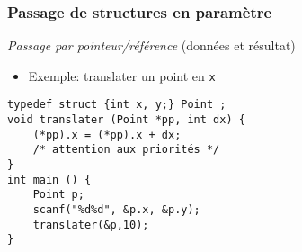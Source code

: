 \documentclass[table,handout,tikz,12pt,svgnames]{beamer}
\begin{document}
\begin{frame}[fragile=singleslide]
	\frametitle{Passage de structures en paramètre}
	\vspace{-0.7cm}
	\begin{itemize}
	\vspace{.3cm}	
	\end{itemize}
				\begin{verbatim}
typedef struct {int x, y;} Point ;
void translater (Point *pp, int dx) {
	(*pp).x = (*pp).x + dx; 
	/* attention aux priorités */
}
int main () {
	Point p;
	scanf("%d%d", &p.x, &p.y);
	translater(&p,10);
}
				\end{verbatim}				
\end{frame}
\end{document}
